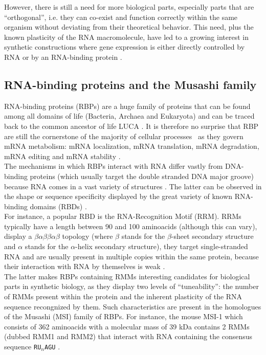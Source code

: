 However, there is still a need for more biological parts, especially parts that are ``orthogonal'', i.e. they can co-exist and function correctly within the same organism without deviating from their theoretical behavior. This need, plus the known plasticity of the RNA macromolecule, have led to a growing interest in synthetic constructions where gene expression is either directly controlled by RNA \cite{siciliano_2013,seok_2017} or by an RNA-binding protein \cite{belmont_2010,cao_2015,katz_2019,babitzke_2009}.

\subsection{RNA-binding proteins and the Musashi family}

RNA-binding proteins (RBPs) are a huge family of proteins that can be found among all domains of life (Bacteria, Archaea and Eukaryota) \cite{lykke_1997,draper_1999,holmqvist_2018} and can be traced back to the common ancestor of life LUCA \cite{koonin_2020}. It is therefore no surprise that RBP are still the cornerstone of the majority of cellular processes \cite{holmqvist_2018} as they govern mRNA metabolism: mRNA localization, mRNA translation, mRNA degradation, mRNA editing and mRNA stability \cite{re_2013}.\\

The mechanisms in which RBPs interact with RNA differ vastly from DNA-binding proteins (which usually target the double stranded DNA major groove) because RNA comes in a vast variety of structures \cite{re_2013,corley_2020}. The latter can be observed in the shape or sequence specificity displayed by the great variety of known RNA-binding domains (RBDs) \cite{stefl_2005}.\\

For instance, a popular RBD is the RNA-Recognition Motif (RRM). RRMs typically have a length between 90 and 100 aminoacids (although this can vary), display a $\beta\alpha\beta\beta\alpha\beta$ topology (where $\beta$ stands for the $\beta$-sheet secondary structure and $\alpha$ stands for the $\alpha$-helix secondary structure), they target single-stranded RNA and are usually present in multiple copies within the same protein, because their interaction with RNA by themselves is weak \cite{re_2013}.\\

The latter makes RBPs containing RMMs interesting candidates for biological parts in synthetic biology, as they display two levels of ``tuneability'': the number of RMMs present within the protein and the inherent plasticity of the RNA sequence recongnized by them. Such characteristics are present in the homologues of the Musashi (MSI) family of RBPs. For instance, the mouse MSI-1 which consists of 362 aminoacids with a molecular mass of 39 kDa \cite{sakakibara_1996} contains 2 RMMs (dubbed RMM1 and RMM2) that interact with RNA containing the consensus sequence \texttt{RU}$_n$\texttt{AGU} \cite{imai_2001,zearfoss_2014}.\\

